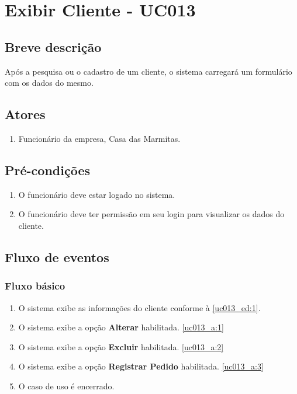 \chapter{Exibir Cliente - UC013} \label{uc013}

\section{Breve descrição}

Após a pesquisa ou o cadastro de um cliente, o sistema carregará um formulário com os dados do mesmo.

\section{Atores}

\begin{enumerate}
	\item Funcionário da empresa, Casa das Marmitas.
\end{enumerate}

\section{Pré-condições}

\begin{enumerate}
	\item O funcionário deve estar logado no sistema.
	\item O funcionário deve ter permissão em seu login para visualizar os dados do cliente.
\end{enumerate}

\section{Fluxo de eventos}

\subsection{Fluxo básico}

\begin{enumerate}[label=P\arabic*]
	\item O sistema exibe as informações do cliente conforme à \ref{uc013_ed:1}. \label{uc013_p:1}
	\item O sistema exibe a opção \textbf{Alterar} habilitada.\label{uc013_p:2} \ref{uc013_a:1} 
	\item O sistema exibe a opção \textbf{Excluir} habilitada.\label{uc013_p:3} \ref{uc013_a:2}
	\item O sistema exibe a opção \textbf{Registrar Pedido} habilitada.\label{uc013_p:4} \ref{uc013_a:3}
	\item O caso de uso é encerrado.
\end{enumerate}

